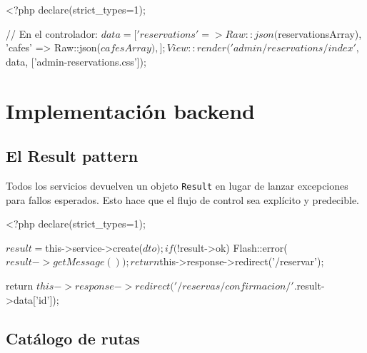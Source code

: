 \documentclass[12pt,a4paper,twoside,openright]{report}
\begin{document}
\begin{phpcode}[caption={Pasar JSON seguro a Alpine.js}]
<?php declare(strict_types=1);

// En el controlador:
$data = [
    'reservations' => Raw::json($reservationsArray),
    'cafes'        => Raw::json($cafesArray),
];
View::render('admin/reservations/index', $data, ['admin-reservations.css']);
\end{phpcode}

\section{Implementación backend}
\label{sec:backend}

\subsection{El Result pattern}

Todos los servicios devuelven un objeto \texttt{Result} en lugar de lanzar excepciones
para fallos esperados. Esto hace que el flujo de control sea explícito y predecible.


\begin{phpcode}[caption={Consumo del Result en el controlador}]
<?php declare(strict_types=1);

$result = $this->service->create($dto);

if (!$result->ok) {
    Flash::error($result->getMessage());
    return $this->response->redirect('/reservar');
}

return $this->response->redirect('/reservas/confirmacion/' . $result->data['id']);
\end{phpcode}

\subsection{Catálogo de rutas}
\label{subsec:rutas}
\end{document}
